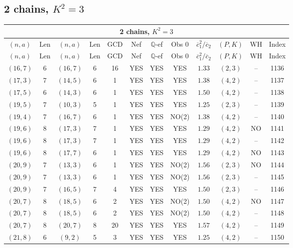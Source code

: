\subsection{2 chains, $K^2 = 3$}
\begin{longtable}{|c|c|c|c|c|c|c|c|c|c|c|c|}
\hline
\multicolumn{12}{|c|}{2 chains, $K^2 = 3$}\\
\hline
$(n,a)$ & Len & $(n,a)$ & Len & GCD & Nef & $\mathbb Q$-ef & Obs 0 & $\overline c_1^2 / \overline c_2$ & $(P,K)$ & WH & Index\\
\hline
\endfirsthead

\hline
$(n,a)$ & Len & $(n,a)$ & Len & GCD & Nef & $\mathbb Q$-ef & Obs 0 & $\overline c_1^2 / \overline c_2$ & $(P,K)$ & WH & Index\\
\hline
\endhead
\hline
\endfoot

$(16,7)$ & 6 & $(16,7)$ & 6 & 16 & YES & YES & YES & $1.33$ & $(2,3)$ & -- & 1136\\
$(17,3)$ & 7 & $(14,5)$ & 6 & 1 & YES & YES & YES & $1.38$ & $(4,2)$ & -- & 1137\\
$(17,5)$ & 6 & $(14,3)$ & 6 & 1 & YES & YES & YES & $1.50$ & $(4,2)$ & -- & 1138\\
$(19,5)$ & 7 & $(10,3)$ & 5 & 1 & YES & YES & YES & $1.25$ & $(2,3)$ & -- & 1139\\
$(19,4)$ & 7 & $(16,7)$ & 6 & 1 & YES & YES & NO(2) & $1.38$ & $(4,2)$ & -- & 1140\\
$(19,6)$ & 8 & $(17,3)$ & 7 & 1 & YES & YES & YES & $1.29$ & $(4,2)$ & NO & 1141\\
$(19,6)$ & 8 & $(17,3)$ & 7 & 1 & YES & YES & YES & $1.29$ & $(4,2)$ & -- & 1142\\
$(19,6)$ & 8 & $(17,7)$ & 6 & 1 & YES & YES & YES & $1.29$ & $(4,2)$ & NO & 1143\\
$(20,9)$ & 7 & $(13,3)$ & 6 & 1 & YES & YES & NO(2) & $1.56$ & $(2,3)$ & NO & 1144\\
$(20,9)$ & 7 & $(13,3)$ & 6 & 1 & YES & YES & NO(2) & $1.56$ & $(2,3)$ & -- & 1145\\
$(20,9)$ & 7 & $(16,5)$ & 7 & 4 & YES & YES & YES & $1.50$ & $(2,3)$ & -- & 1146\\
$(20,7)$ & 8 & $(18,5)$ & 6 & 2 & YES & YES & NO(2) & $1.50$ & $(4,2)$ & NO & 1147\\
$(20,7)$ & 8 & $(18,5)$ & 6 & 2 & YES & YES & NO(2) & $1.50$ & $(4,2)$ & -- & 1148\\
$(20,7)$ & 8 & $(20,7)$ & 8 & 20 & YES & YES & YES & $1.57$ & $(4,2)$ & -- & 1149\\
$(21,8)$ & 6 & $(9,2)$ & 5 & 3 & YES & YES & YES & $1.25$ & $(4,2)$ & -- & 1150\\

\end{longtable}
